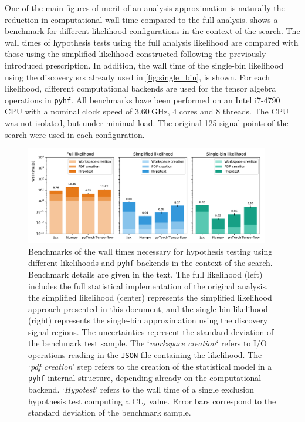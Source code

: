 One of the main figures of merit of an analysis approximation is naturally the reduction in computational wall time compared to the full analysis.  shows a benchmark for different likelihood configurations in the context of the \onelepton search.
The wall times of hypothesis tests using the full analysis likelihood are compared with those using the simplified likelihood constructed following the previously introduced prescription.
In addition, the wall time of the single-bin likelihood using the discovery \glspl{sr} already used in \cref{fig:single_bin}, is shown.
For each likelihood, different computational backends are used for the tensor algebra operations in \texttt{pyhf}. All benchmarks have been performed on an Intel i7-4790 CPU with a nominal clock speed of $\SI{3.60}{\GHz}$, 4 cores and 8 threads.
The CPU was not isolated, but under minimal load.
The original 125 signal points of the \onelepton search were used in each configuration.

\begin{figure}
	\centering    
	\includegraphics[width=0.95\textwidth]{benchmark_1Lbb}
	\caption{Benchmarks of the wall times necessary for hypothesis testing using different likelihoods and \texttt{pyhf} backends in the context of the \onelepton search. Benchmark details are given in the text. The full likelihood (left) includes the full statistical implementation of the original analysis, the simplified likelihood (center) represents the simplified likelihood approach presented in this document, and the single-bin likelihood (right) represents the single-bin approximation using the discovery signal regions. The uncertainties represent the standard deviation of the benchmark test sample. The `\textit{workspace creation}` refers to I/O operations reading in the \texttt{JSON} file containing the likelihood. The `\textit{pdf creation}' step refers to the creation of the statistical model in a \texttt{pyhf}-internal structure, depending already on the computational backend. `\textit{Hypotest}' refers to the wall time of a single exclusion hypothesis test computing a CL$_s$ value. Error bars correspond to the standard deviation of the benchmark sample.}\label{fig:benchmark}
	\label{fig:benchmark_1Lbb}
\end{figure}

